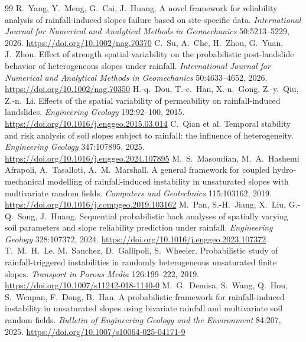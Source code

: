 \documentclass[11pt,a4paper]{article}
\begin{document}
\begin{thebibliography}{99}
 R.~Yang, Y.~Meng, G.~Cai, J.~Huang. A novel framework for reliability analysis of rainfall-induced
  slopes failure based on site-specific data. \emph{International Journal for Numerical and Analytical Methods in
  Geomechanics} 50:5213--5229, 2026. \url{https://doi.org/10.1002/nag.70370}
 C.~Su, A.~Che, H.~Zhou, G.~Yuan, J.~Zhou. Effect of strength spatial variability on the probabilistic
  post-landslide behavior of heterogeneous slopes under rainfall. \emph{International Journal for Numerical and
  Analytical Methods in Geomechanics} 50:4633--4652, 2026. \url{https://doi.org/10.1002/nag.70350}
 H.-q.~Dou, T.-c.~Han, X.-n.~Gong, Z.-y.~Qiu, Z.-n.~Li. Effects of the spatial variability of
  permeability on rainfall-induced landslides. \emph{Engineering Geology} 192:92--100, 2015.
  \url{https://doi.org/10.1016/j.enggeo.2015.03.014}
 C.~Qian et al. Temporal stability and risk analysis of soil slopes subject to rainfall: the influence
  of heterogeneity. \emph{Engineering Geology} 347:107895, 2025. \url{https://doi.org/10.1016/j.enggeo.2024.107895}
 M.~S.~Masoudian, M.~A.~Hashemi Afrapoli, A.~Tasalloti, A.~M.~Marshall. A general framework for
  coupled hydro-mechanical modelling of rainfall-induced instability in unsaturated slopes with multivariate random
  fields. \emph{Computers and Geotechnics} 115:103162, 2019. \url{https://doi.org/10.1016/j.compgeo.2019.103162}
 M.~Pan, S.-H.~Jiang, X.~Liu, G.-Q.~Song, J.~Huang. Sequential probabilistic back analyses of
  spatially varying soil parameters and slope reliability prediction under rainfall. \emph{Engineering Geology}
  328:107372, 2024. \url{https://doi.org/10.1016/j.enggeo.2023.107372}
 T.~M.~H.~Le, M.~Sanchez, D.~Gallipoli, S.~Wheeler. Probabilistic study of rainfall-triggered
  instabilities in randomly heterogeneous unsaturated finite slopes. \emph{Transport in Porous Media} 126:199--222,
  2019. \url{https://doi.org/10.1007/s11242-018-1140-0}
 M.~G.~Demisa, S.~Wang, Q.~Hou, S.~Wenpan, F.~Dong, B.~Han. A probabilistic framework for
  rainfall-induced instability in unsaturated slopes using bivariate rainfall and multivariate soil random fields.
  \emph{Bulletin of Engineering Geology and the Environment} 84:207, 2025.
  \url{https://doi.org/10.1007/s10064-025-04171-9}
\end{thebibliography}
\end{document}
